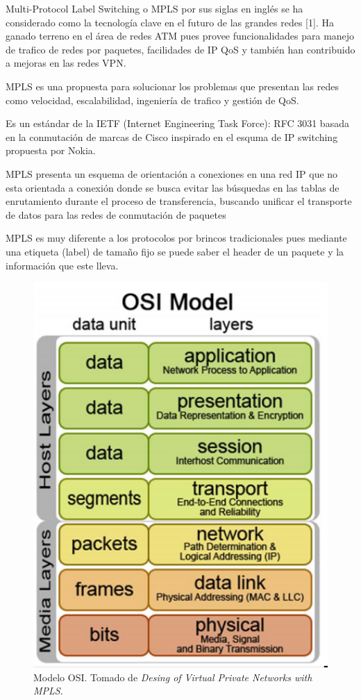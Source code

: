 \documentclass[10pt,journal,compsoc]{IEEEtran}
\begin{document}
Multi-Protocol Label Switching o MPLS por sus siglas en inglés se ha considerado como la tecnología clave en el futuro de las grandes redes [1]. Ha ganado terreno en el área de redes ATM pues provee funcionalidades para manejo de trafico de redes por paquetes, facilidades de IP QoS y también han contribuido a mejoras en las redes VPN. 

MPLS es una propuesta para solucionar los problemas que presentan las redes como velocidad, escalabilidad, ingeniería de trafico y gestión de QoS.

Es un estándar de la IETF (Internet Engineering Task Force): RFC 3031 basada en la conmutación de marcas de Cisco inspirado en el esquma de IP switching propuesta por Nokia. 

MPLS presenta un esquema de orientación a conexiones en una red IP que no esta orientada a conexión donde se busca evitar las búsquedas en las tablas de enrutamiento durante el proceso de transferencia, buscando unificar el transporte de datos para las redes de conmutación de paquetes

MPLS es muy diferente a los protocolos por brincos tradicionales pues mediante una etiqueta (label) de tamaño fijo se puede saber el header de un paquete y la información que este lleva. 


\begin{figure}[h]
    \center
    \includegraphics[width=15cm]{osi}
    \caption{Modelo OSI. Tomado de  \emph{Desing of Virtual Private Networks with MPLS}\cite{rexford}.}
    \label{fig:tradicitional-architecture}
\end{figure}
\end{document}
